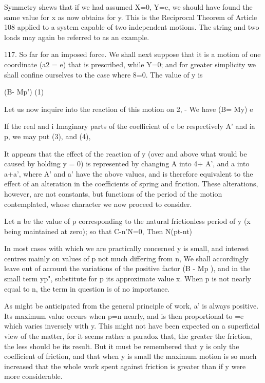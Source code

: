 Symmetry shews that if we had assumed X=0, Y=e, we should have found the same
value for x as now obtains for y. This is the Reciprocal Theorem of Article 108
applied to a system capable of two independent motions. The string and two
loads may again be referred to as an example.

117. So far for an imposed force. We shall next suppose that it is a motion of
one coordinate (a2 = e) that is prescribed, while Y=0; and for greater
simplicity we shall confine ourselves to the case where 8=0. The value of y is

(B- Mp') (1)

Let us now inquire into the reaction of this motion on 2, - We have (B= My) e

If the real and i Imaginary parts of the coefficient of e be respectively A'
and ia p, we may put (3), and (4),

It appears that the effect of the reaction of y (over and above what would be
caused by holding y = 0) is represented by changing A into 4+ A', and a into
a+a', where A' and a' have the above values, and is therefore equivalent to the
effect of an alteration in the coefficients of spring and friction. These
alterations, however, are not constants, but functions of the period of the
motion contemplated, whose character we now proceed to consider.

Let n be the value of p corresponding to the natural frictionless period of y
(x being maintained at zero); so that C-n'N=0, Then N(pt-nt)

In most cases with which we are practically concerned y is small, and interest
centres mainly on values of p not much differing from n, We shall accordingly
leave out of account the variations of the positive factor (B - Mp ), and in
the small term yp", substitute for p its approximate value x. When p is not
nearly equal to n, the term in question is of no importance.


As might be anticipated from the general principle of work, a' is always
positive. Its maximum value occurs when p=n nearly, and is then proportional to
=e which varies inversely with y. This might not have been expected on a
superficial view of the matter, for it seems rather a paradox that, the greater
the friction, the less should be its result. But it must be remembered that y
is only the coefficient of friction, and that when y is small the maximum
motion is so much increased that the whole work spent against friction is
greater than if y were more considerable.

